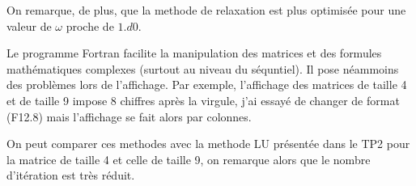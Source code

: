 \documentclass{report}
\begin{document}
On remarque, de plus, que la methode de relaxation est plus optimisée pour une valeur de $\omega$ proche de $1.d0$.

Le programme Fortran facilite la manipulation des matrices et des formules mathématiques complexes (surtout au niveau
du séquntiel). Il pose néammoins des problèmes lors de l'affichage. Par exemple, l'affichage des matrices de taille 4
et de taille 9 impose 8 chiffres après la virgule, j'ai essayé de changer de format (F12.8) mais l'affichage se fait
alors par colonnes.

On peut comparer ces methodes avec la methode LU présentée dans le TP2 pour la matrice de taille 4 et celle de taille 9,
on remarque alors que le nombre d'itération est très réduit.
\end{document}
